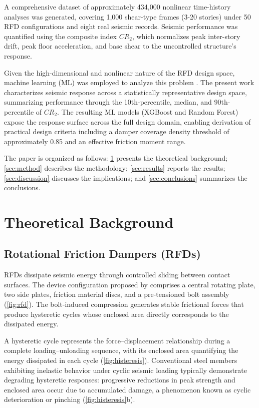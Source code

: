 \documentclass[preprint,12pt,authoryear]{elsarticle}
\begin{document}
A comprehensive dataset of approximately 434,000 nonlinear time-history analyses was generated, covering 1,000 shear-type frames (3-20 stories) under 50 RFD configurations and eight real seismic records. Seismic performance was quantified using the composite index $CR_2$, which normalizes peak inter-story drift, peak floor acceleration, and base shear to the uncontrolled structure's response.

Given the high-dimensional and nonlinear nature of the RFD design space, machine learning (ML) was employed to analyze this problem \citep{Kazemi2022}. The present work characterizes seismic response across a statistically representative design space, summarizing performance through the 10th-percentile, median, and 90th-percentile of $CR_2$. The resulting ML models (XGBoost and Random Forest) expose the response surface across the full design domain, enabling derivation of practical design criteria including a damper coverage density threshold of approximately 0.85 and an effective friction moment range.

The paper is organized as follows: \cref{sec:theory} presents the theoretical background; \cref{sec:method} describes the methodology; \cref{sec:results} reports the results; \cref{sec:discussion} discusses the implications; and \cref{sec:conclusions} summarizes the conclusions.
\section{Theoretical Background}
\label{sec:theory}

\subsection{Rotational Friction Dampers (RFDs)}
\label{sec:theory:rfd}

RFDs dissipate seismic energy through controlled sliding between contact surfaces. The device configuration proposed by \citet{Mualla2002} comprises a central rotating plate, two side plates, friction material discs, and a pre-tensioned bolt assembly (\cref{fig:rfd}). The bolt-induced compression generates stable frictional forces that produce hysteretic cycles whose enclosed area directly corresponds to the dissipated energy.

A hysteretic cycle represents the force--displacement relationship during a complete loading--unloading sequence, with its enclosed area quantifying the energy dissipated in each cycle (\cref{fig:histeresis}). Conventional steel members exhibiting inelastic behavior under cyclic seismic loading typically demonstrate degrading hysteretic responses: progressive reductions in peak strength and enclosed area occur due to accumulated damage, a phenomenon known as cyclic deterioration or pinching \citep{chopra_dynamics_2015} (\cref{fig:histeresis}b). 
\end{document}
